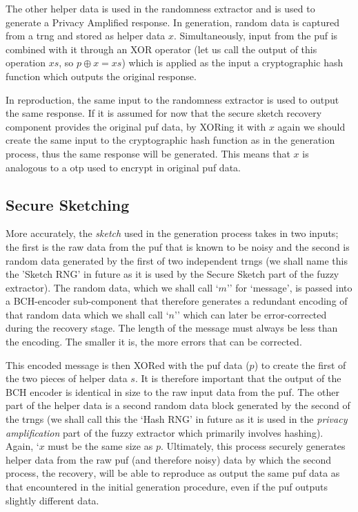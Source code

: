 The other helper data is used in the randomness extractor and is used to
generate a Privacy Amplified response. In generation, random data is captured
from a \gls{trng} and stored as helper data $x$. Simultaneously, input
from the \gls{puf} is combined with it through an XOR
operator (let us call the output of this operation $xs$, so $p \oplus x = xs$)
which is applied as the input a
cryptographic hash function which outputs the original response.

In reproduction, the same input to the randomness extractor is used to output
the same response.
If it is assumed for now that the secure sketch recovery component provides the
original \gls{puf} data, by XORing it with $x$ again we should create the same input to the
cryptographic hash function as in the generation process, thus the same response
will be generated. This means that $x$ is analogous to a \gls{otp} used to
encrypt in original \gls{puf} data.

\subsection{Secure Sketching}

More accurately, the \emph{sketch} used in the generation process takes in two
inputs; the first is the raw data
from the \gls{puf} that is known to be noisy and the second is random data generated
by the first of two independent \glspl{trng} (we shall name
this the 'Sketch RNG' in future as it is used by the Secure Sketch part of the
fuzzy extractor). The random data, which we shall call `$m$' for `message', is passed into a
BCH-encoder sub-component that therefore generates a redundant encoding of that
random data which we shall call `$n$' which can later be error-corrected during the
recovery stage. The length of the message must always be less than the
encoding. The smaller it is, the more errors that can be corrected.

This encoded message is then XORed with the \gls{puf} data ($p$) to create the first of
the two pieces of helper data $s$. It is therefore important that the output of the
BCH encoder is identical in size to the raw input data from the \gls{puf}.
The other part of the helper data is a second random data block generated by the
second of the \glspl{trng} (we shall call this the `Hash RNG'
in future as it is used in the \emph{privacy amplification} part of the fuzzy extractor
which primarily involves hashing). Again, $x$ must be the same size as $p$.
Ultimately, this process securely generates helper data from the
raw \gls{puf} (and therefore noisy) data by which the second process, the
recovery, will be able to reproduce as output the same \gls{puf} data as that
encountered in the initial generation procedure, even if the \gls{puf} outputs
slightly different data.

